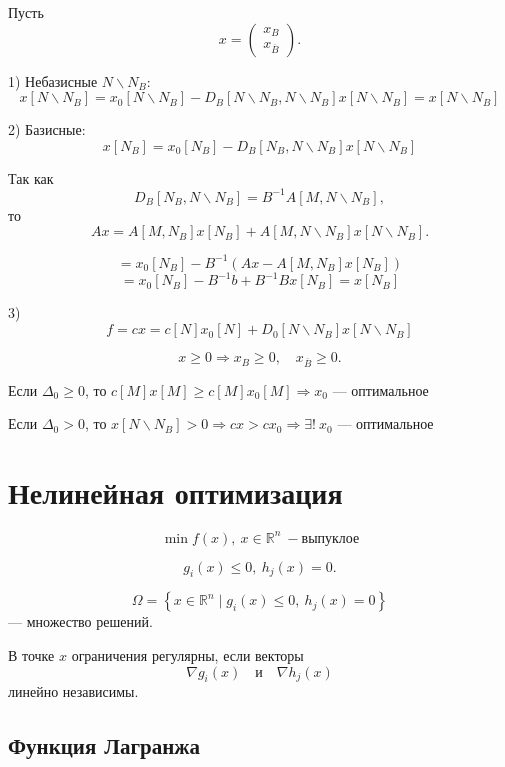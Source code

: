 \documentclass[12pt,a4paper]{article}
\begin{document}
\begin{proofbox}{}

Пусть
\[
x=
\begin{pmatrix}
x_B\\
x_{\overline B}
\end{pmatrix}.
\]

1) Небазисные $N \backslash N_B$:
\[
x[N \backslash N_B]
=
x_0[N \backslash N_B]
-
D_B[N \backslash N_B,N \backslash N_B]x[N \backslash N_B]
=
x[N \backslash N_B]
\]

2) Базисные:
\[
x[N_B]
=
x_0[N_B]
-
D_B[N_B,N \backslash N_B]x[N \backslash N_B]
\]

Так как
\[
D_B[N_B,N \backslash N_B]
=
B^{-1}A[M,N \backslash N_B],
\]
то
\[
Ax
=
A[M,N_B]x[N_B]
+
A[M,N \backslash N_B]x[N \backslash N_B].
\]

\[
=
x_0[N_B]
-
B^{-1}
\left(
Ax-A[M,N_B]x[N_B]
\right)
\]
\[
=
x_0[N_B]-B^{-1}b+B^{-1}Bx[N_B]
=
x[N_B]
\]

3)
\[
f=cx
=
c[N]x_0[N]
+
D_0[N\backslash N_B]x[N \backslash N_B]
\]

\[
x\geq0
\Rightarrow
x_B\geq0,\quad x_{\overline B}\geq0.
\]

\medskip

Если $\Delta_0\geq0$, то $
c[M]x[M]\geq c[M]x_0[M]
\Rightarrow
x_0$ --- оптимальное

\medskip

Если $\Delta_0>0$, то
$x[N \backslash N_B]>0
\Rightarrow
cx>cx_0
\Rightarrow
\exists!\ x_0$ --- оптимальное

\end{proofbox}

\newpage

\section{Нелинейная оптимизация}

\[
\min f(x), \ x\in\mathbb{R}^n \ - \text{выпуклое} 
\]

\[
g_i(x)\leq 0, \
h_j(x)=0.
\]

\[
\Omega=\left\{x\in\mathbb{R}^n\mid g_i(x)\leq 0,\ h_j(x)=0\right\}
\]
--- множество решений.

В точке $x$ ограничения регулярны, если векторы
\[
\nabla g_i(x)\quad\text{и}\quad \nabla h_j(x)
\]
линейно независимы.

\subsection{Функция Лагранжа}
\end{document}
